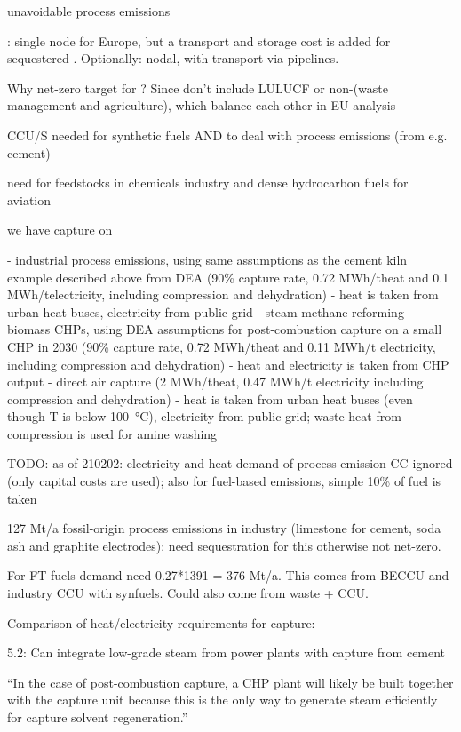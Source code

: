 unavoidable process emissions

\co: single node for Europe, but a transport and storage cost is added for sequestered \co. Optionally: nodal, with \co transport via pipelines.

Why net-zero target for \co? Since don't include LULUCF or non-\co (waste management and agriculture), which balance each other in EU analysis

CCU/S needed for synthetic fuels AND to deal with process emissions (from e.g.
cement)

need for feedstocks in chemicals industry and dense hydrocarbon fuels for aviation

we have capture on

- industrial process emissions, using same assumptions as the cement kiln
example described above from DEA  (90\% capture rate, 0.72 MWh/t\co heat and
0.1 MWh/t\co electricity, including compression and dehydration) - heat is
taken from urban heat buses, electricity from public grid - steam methane
reforming - biomass CHPs, using DEA assumptions for post-combustion capture on a
small CHP in 2030 (90\% capture rate, 0.72 MWh/t\co heat and 0.11 MWh/t\co
electricity, including compression and dehydration) - heat and electricity is
taken from CHP output - direct air capture (2 MWh/t\co heat, 0.47 MWh/t\co
electricity including compression and dehydration) - heat is taken from urban
heat buses (even though T is below \SI{100}{\celsius}), electricity from public grid; waste
heat from compression is used for amine washing

TODO: as of 210202: electricity and heat demand of process emission CC ignored
(only capital costs are used); also for fuel-based emissions, simple 10\% of
fuel is taken

127 Mt\co/a fossil-origin process emissions in industry (limestone for cement,
soda ash and graphite electrodes); need sequestration for this otherwise not
net-zero.

For FT-fuels demand need 0.27*1391 = 376 Mt\co/a. This comes from BECCU and
industry CCU with synfuels. Could also come from waste + CCU.


Comparison of heat/electricity requirements for capture:

 5.2: Can integrate low-grade steam from power plants with
\co capture from cement

``In the case of post-combustion \co capture, a CHP plant will likely be built
together with the \co capture unit because this is the only way to generate
steam efficiently for \co capture solvent regeneration.''

